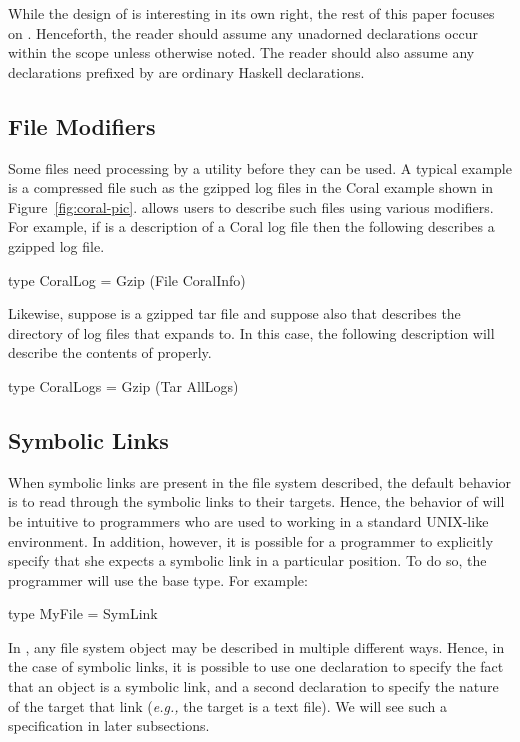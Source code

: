 While the design of \padshaskell{} is interesting in its own right, the rest of this
paper focuses on \forest{}.  Henceforth, the reader should assume
any unadorned declarations 
occur within the \forest{} scope \cd{[forest| ... |]} unless otherwise noted.
The reader should also assume any declarations prefixed by \cd{>} are ordinary
Haskell declarations.

\subsection{File Modifiers}
\label{sec:file-modifiers}

Some files need processing by a utility before they can be used.  A typical
example is a compressed file such as the gzipped log files in the Coral
example shown in Figure~\ref{fig:coral-pic}.  \forest{} allows users to describe such 
files using various modifiers.  For example, if  is a \padshaskell{}
description of a Coral log file then the following describes a gzipped log file.
\begin{code}
type CoralLog = Gzip (File CoralInfo)
\end{code}
Likewise, suppose  is a gzipped tar file and suppose also that 
 describes the directory of log files that  expands
to.  In this case, the following description will describe the contents of
 properly.
\begin{code}
type CoralLogs = Gzip (Tar AllLogs)
\end{code}

\subsection{Symbolic Links}
\label{sec:symlinks}

When symbolic links are present in the file system described,
the default behavior is to read through the symbolic links to their
targets.  Hence, the behavior of \forest{} will be intuitive to programmers who
are used to working in a standard UNIX-like environment.  In addition, however, it is possible
for a programmer to explicitly specify that she expects a symbolic link in a particular
position.  To do so, the programmer will use the  base type.  For
example:
\begin{code}
type MyFile = SymLink
\end{code}
In \forest{}, any file system object may be described in multiple different ways.
Hence, in the case of symbolic links, it is possible to use one declaration to
specify the fact that an object is a symbolic link, and a second declaration to specify
the nature of the target that link ({\em e.g.,} the target is a text file).  We will see such 
a specification in later subsections.

